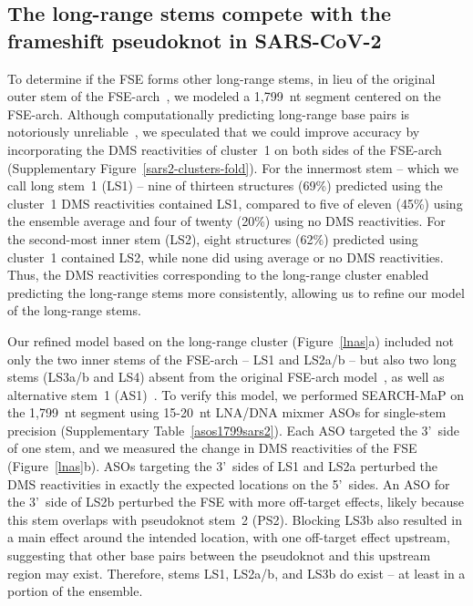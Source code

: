 \documentclass[main.tex]{subfiles}
\begin{document}
\subsection{The long-range stems compete with the frameshift pseudoknot in SARS-CoV-2}

To determine if the FSE forms other long-range stems, in lieu of the original outer stem of the FSE-arch~\cite{Ziv2020}, we modeled a 1,799~nt segment centered on the FSE-arch.
Although computationally predicting long-range base pairs is notoriously unreliable~\cite{Doshi2004,Nicholson2015}, we speculated that we could improve accuracy by incorporating the DMS reactivities of cluster~1 on both sides of the FSE-arch (Supplementary Figure~\ref{sars2-clusters-fold}).
For the innermost stem -- which we call long stem~1 (LS1) -- nine of thirteen structures (69\%) predicted using the cluster~1 DMS reactivities contained LS1, compared to five of eleven (45\%) using the ensemble average and four of twenty (20\%) using no DMS reactivities.
For the second-most inner stem (LS2), eight structures (62\%) predicted using cluster~1 contained LS2, while none did using average or no DMS reactivities.
Thus, the DMS reactivities corresponding to the long-range cluster enabled predicting the long-range stems more consistently, allowing us to refine our model of the long-range stems.

Our refined model based on the long-range cluster (Figure~\ref{lnas}a) included not only the two inner stems of the FSE-arch -- LS1 and LS2a/b -- but also two long stems (LS3a/b and LS4) absent from the original FSE-arch model~\cite{Ziv2020}, as well as alternative stem~1 (AS1)~\cite{Lan2022}.
To verify this model, we performed SEARCH-MaP on the 1,799~nt segment using 15-20~nt LNA/DNA mixmer ASOs for single-stem precision (Supplementary Table~\ref{asos1799sars2}).
Each ASO targeted the 3'~side of one stem, and we measured the change in DMS reactivities of the FSE (Figure~\ref{lnas}b).
ASOs targeting the 3'~sides of LS1 and LS2a perturbed the DMS reactivities in exactly the expected locations on the 5'~sides.
An ASO for the 3'~side of LS2b perturbed the FSE with more off-target effects, likely because this stem overlaps with pseudoknot stem~2 (PS2).
Blocking LS3b also resulted in a main effect around the intended location, with one off-target effect upstream, suggesting that other base pairs between the pseudoknot and this upstream region may exist.
Therefore, stems LS1, LS2a/b, and LS3b do exist -- at least in a portion of the ensemble.
\end{document}
